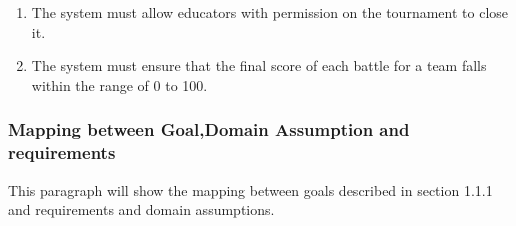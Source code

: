 \begin{enumerate}[label=\bfseries R\arabic*]
    \item  The system must allow educators with permission on the tournament  to close it. 

    \item  The system must ensure that the final score of each battle for a team falls within the range of 0 to 100.


\end{enumerate}
\subsubsection{Mapping between Goal,Domain Assumption and requirements}
This paragraph will show  the mapping between goals described in section 1.1.1 and requirements and  domain assumptions.


